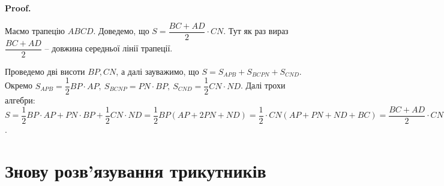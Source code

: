 \documentclass[a4paper, 10pt]{article}
\makeatletter
\theoremstyle{theoremdd}
\theoremstyle{theoremdd}
\theoremstyle{theoremdd}
\theoremstyle{theoremdd}
\theoremstyle{theoremdd}
\theoremstyle{theoremdd}
\theoremstyle{theoremdd}
\theoremstyle{theoremdd}
\theoremstyle{theoremdd}
\renewenvironment{proof}[1][Proof.\\]{\par
\pushQED{\hfill \qed}%
\normalfont \topsep6\p@\@plus6\p@\relax
\trivlist
\item\relax
{\bfseries
#1\@addpunct{.}}\hspace\labelsep\ignorespaces
}{%
\popQED\endtrivlist\@endpefalse
}
\makeatother
\begin{document}
\begin{proof}
Маємо трапецію $ABCD$. Доведемо, що $S = \dfrac{BC+AD}{2} \cdot CN$. Тут як раз вираз $\dfrac{BC+AD}{2}$ -- довжина середньої лінії трапеції.
\begin{figure}[H]
\centering
{}
\end{figure}
Проведемо дві висоти $BP, CN$, а далі зауважимо, що $S = S_{APB} + S_{BCPN} + S_{CND}$.\\
Окремо $S_{APB} = \dfrac{1}{2} BP \cdot AP,\ S_{BCNP} = PN \cdot BP,\ S_{CND} = \dfrac{1}{2} CN \cdot ND$. Далі трохи алгебри:\\
$S = \dfrac{1}{2} BP \cdot AP + PN \cdot BP + \dfrac{1}{2} CN \cdot ND = \dfrac{1}{2} BP \left( AP + 2 PN + ND \right) = \dfrac{1}{2} \cdot CN (AP + PN + ND + BC) = \dfrac{BC + AD}{2} \cdot CN$.
\end{proof}

\newpage

\section{Знову розв'язування трикутників}
\end{document}
